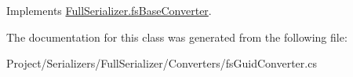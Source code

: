 Implements \hyperlink{class_full_serializer_1_1fs_base_converter_aeb0065770e53ecaac3f5dd3b5cd670d1}{Full\+Serializer.\+fs\+Base\+Converter}.



The documentation for this class was generated from the following file\+:\begin{DoxyCompactItemize}
\item 
Project/\+Serializers/\+Full\+Serializer/\+Converters/fs\+Guid\+Converter.\+cs\end{DoxyCompactItemize}
